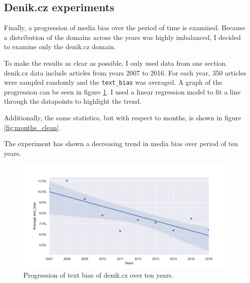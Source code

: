 


\subsection{Denik.cz experiments}
Finally, a progression of media bias over the period of time is examined. Because a distribution of the domains across the years was highly imbalanced, I decided to examine only the denik.cz domain.

To make the results as clear as possible, I only used data from one section. denik.cz data include articles from years 2007 to 2016. For each year, 350 articles were sampled randomly and the \verb|text_bias| was averaged. A graph of the progression can be seen in figure \ref{fig:denik_years}. I used a linear regression model to fit a line through the datapoints to highlight the trend.

Additionally, the same statistics, but with respect to months, is shown in figure \ref{fig:months_clean}.

The experiment has shown a decreasing trend in media bias over period of ten years.
\newpage


\begin{figure}[h]

  \includegraphics[scale=0.5]{my_modules/multimedia/inference/denik_years.png}
  \caption{Progression of text bias of denik.cz over ten years.}
  \label{fig:denik_years}

\end{figure}


